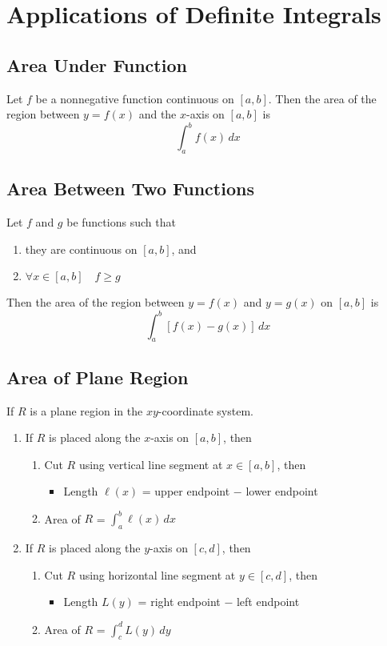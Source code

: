 \documentclass[../ma2002_notes.tex]{subfiles}
\begin{document}
\section{Applications of Definite Integrals}
\subsection{Area Under Function}
Let \(f\) be a nonnegative function continuous on \([a,b]\). Then the area of the region between \(y=f(x)\) and the \(x\)-axis on \([a,b]\) is
\[\int_a^bf(x)\,dx\]

\subsection{Area Between Two Functions}
Let \(f\) and \(g\) be functions such that
\begin{enumerate}
	\item they are continuous on \([a,b]\), and
	\item\(\forall x\in[a,b]\quad f\geq g\)
\end{enumerate}
Then the area of the region between \(y=f(x)\) and \(y=g(x)\) on \([a,b]\) is
\[\int_a^b[f(x)-g(x)]\,dx\]

\subsection{Area of Plane Region}
If \(R\) is a plane region in the \(xy\)-coordinate system.
\begin{enumerate}
	\item If \(R\) is placed along the \(x\)-axis on \([a,b]\), then
	\begin{enumerate}
		\item Cut \(R\) using vertical line segment at \(x\in[a,b]\), then
		\begin{itemize}
			\item Length \(\ell(x)\) = upper endpoint \(-\) lower endpoint
		\end{itemize}
		\item Area of \(R\) = \(\int_a^b\ell(x)\,dx\)
	\end{enumerate}
	\item If \(R\) is placed along the \(y\)-axis on \([c,d]\), then
	\begin{enumerate}
		\item Cut \(R\) using horizontal line segment at \(y\in[c,d]\), then
		\begin{itemize}
			\item Length \(L(y)\) = right endpoint \(-\) left endpoint
		\end{itemize}
		\item Area of \(R\) = \(\int_c^dL(y)\,dy\)
	\end{enumerate}
\end{enumerate}
\end{document}
